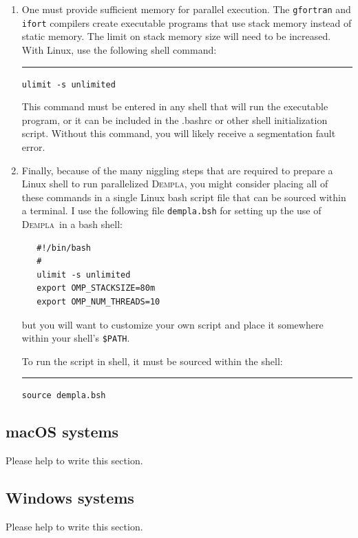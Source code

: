 \documentclass[letterpaper,11pt]{article}
\newcommand{\Dempla}{\textsc{Dempla}}
\begin{document}
\begin{enumerate}
\rule{3ex}{0ex}\texttt{OMP\_NUM\_THREADS=4 OMP\_STACKSIZE=80m ./dempla.exe}
%
\item
One must provide sufficient memory for parallel execution.
The \texttt{gfortran} and \texttt{ifort}
compilers create executable programs
that use stack memory instead of static memory.
The limit on stack memory size will need to be increased.
With Linux,
use the following shell command:\\
\rule{3ex}{0ex}\texttt{ulimit -s unlimited}
\par
This command must be entered in any shell that will run the
executable program, or it can be included in the .bashrc or other
shell initialization script.  Without this command, you will
likely receive a segmentation fault error.
%
\item
Finally, because of the many niggling steps that
are required to prepare a Linux shell to run parallelized
\Dempla, you might consider placing all of these
commands in a single Linux bash script file that can
be sourced within a terminal.
I use the following file \texttt{dempla.bsh} for setting up
the use of \Dempla\ in a bash shell:
\begin{verbatim}
   #!/bin/bash
   #
   ulimit -s unlimited
   export OMP_STACKSIZE=80m
   export OMP_NUM_THREADS=10
\end{verbatim}
but you will want to customize your own script and place it
somewhere within your shell's \texttt{\$PATH}.
\par
To run the script in shell, it must be sourced within the shell:\\
\rule{3ex}{0ex}\texttt{source dempla.bsh}
%
\end{enumerate}
%
\subsection{macOS systems}
Please help to write this section.
%
\subsection{Windows systems}
Please help to write this section.
%
%
\end{document}
